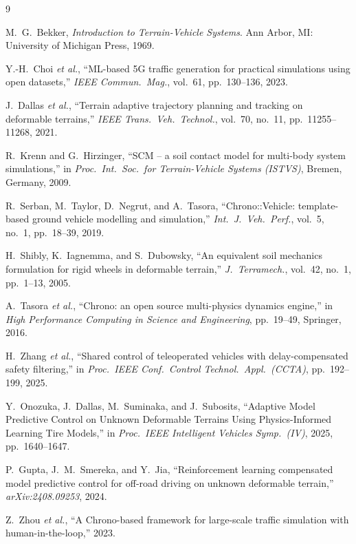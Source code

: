 \documentclass[conference,letterpaper,10pt]{IEEEtran}
\begin{document}
\begin{thebibliography}{9}

  M.~G.~Bekker, \emph{Introduction to Terrain-Vehicle Systems}.
  Ann Arbor, MI: University of Michigan Press, 1969.

  Y.-H.~Choi \emph{et al.}, ``ML-based 5G traffic generation for
  practical simulations using open datasets,''
  \emph{IEEE Commun.\ Mag.}, vol.~61, pp.~130--136, 2023.

  J.~Dallas \emph{et al.}, ``Terrain adaptive trajectory planning
  and tracking on deformable terrains,''
  \emph{IEEE Trans.\ Veh.\ Technol.},
  vol.~70, no.~11, pp.~11255--11268, 2021.

  R.~Krenn and G.~Hirzinger, ``SCM -- a soil contact model for
  multi-body system simulations,'' in
  \emph{Proc.\ Int.\ Soc.\ for Terrain-Vehicle Systems (ISTVS)},
  Bremen, Germany, 2009.

  R.~Serban, M.~Taylor, D.~Negrut, and A.~Tasora,
  ``Chrono::Vehicle: template-based ground vehicle modelling and
  simulation,''
  \emph{Int.\ J.\ Veh.\ Perf.}, vol.~5, no.~1, pp.~18--39, 2019.

  H.~Shibly, K.~Iagnemma, and S.~Dubowsky, ``An equivalent soil
  mechanics formulation for rigid wheels in deformable terrain,''
  \emph{J.\ Terramech.}, vol.~42, no.~1, pp.~1--13, 2005.

  A.~Tasora \emph{et al.}, ``Chrono: an open source multi-physics
  dynamics engine,'' in
  \emph{High Performance Computing in Science and Engineering},
  pp.~19--49, Springer, 2016.

  H.~Zhang \emph{et al.}, ``Shared control of teleoperated vehicles
  with delay-compensated safety filtering,'' in
  \emph{Proc.\ IEEE Conf.\ Control Technol.\ Appl.\ (CCTA)},
  pp.~192--199, 2025.

  Y.~Onozuka, J.~Dallas, M.~Suminaka, and J.~Subosits,
  ``Adaptive Model Predictive Control on Unknown Deformable Terrains
  Using Physics-Informed Learning Tire Models,'' in
  \emph{Proc.\ IEEE Intelligent Vehicles Symp.\ (IV)}, 2025, pp.~1640--1647.

  P.~Gupta, J.~M.~Smereka, and Y.~Jia,
  ``Reinforcement learning compensated model predictive control for
  off-road driving on unknown deformable terrain,''
  \emph{arXiv:2408.09253}, 2024.

  Z.~Zhou \emph{et al.}, ``A Chrono-based framework for large-scale
  traffic simulation with human-in-the-loop,'' 2023.


\end{thebibliography}
\end{document}
